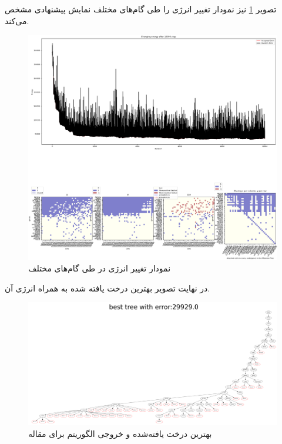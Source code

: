 تصویر \ref{fig:Gene_energy_chart} نیز نمودار تغییر انرژی را طی گام‌های مختلف نمایش پیشنهادی مشخص می‌کند.
\begin{figure}[!ht]
	\centering
	\includegraphics[width=\textwidth]{img/res/sn_benchmark}
	\caption{نمودار تغییر انرژی در طی گام‌های مختلف}
	\label{fig:Gene_energy_chart}
\end{figure}
در نهایت تصویر بهترین درخت یافته شده به همراه انرژی آن.
\begin{figure}[!ht]
	\centering
	\includegraphics[width=\textwidth]{img/res/sn_best_tree}
	\caption{بهترین درخت یافته‌شده و خروجی الگوریتم برای مقاله }
	\label{fig:Gene_best_tree}
\end{figure}

